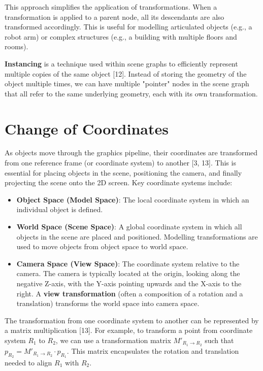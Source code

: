 \documentclass[12pt]{article}
\begin{document}
This approach simplifies the application of transformations. When a transformation is applied to a parent node, all its descendants are also transformed accordingly. This is useful for modelling articulated objects (e.g., a robot arm) or complex structures (e.g., a building with multiple floors and rooms).

\textbf{Instancing} is a technique used within scene graphs to efficiently represent multiple copies of the same object [12]. Instead of storing the geometry of the object multiple times, we can have multiple "pointer" nodes in the scene graph that all refer to the same underlying geometry, each with its own transformation.

\section{Change of Coordinates}

As objects move through the graphics pipeline, their coordinates are transformed from one reference frame (or coordinate system) to another [3, 13]. This is essential for placing objects in the scene, positioning the camera, and finally projecting the scene onto the 2D screen. Key coordinate systems include:

\begin{itemize}
    \item \textbf{Object Space (Model Space)}: The local coordinate system in which an individual object is defined.
    \item \textbf{World Space (Scene Space)}: A global coordinate system in which all objects in the scene are placed and positioned. Modelling transformations are used to move objects from object space to world space.
    \item \textbf{Camera Space (View Space)}: The coordinate system relative to the camera. The camera is typically located at the origin, looking along the negative Z-axis, with the Y-axis pointing upwards and the X-axis to the right. A \textbf{view transformation} (often a composition of a rotation and a translation) transforms the world space into camera space.
\end{itemize}

The transformation from one coordinate system to another can be represented by a matrix multiplication [13]. For example, to transform a point from coordinate system $R_1$ to $R_2$, we can use a transformation matrix $M'_{R_1 \rightarrow R_2}$ such that $p_{R_2} = M'_{R_1 \rightarrow R_2} \cdot p_{R_1}$. This matrix encapsulates the rotation and translation needed to align $R_1$ with $R_2$.
\end{document}
